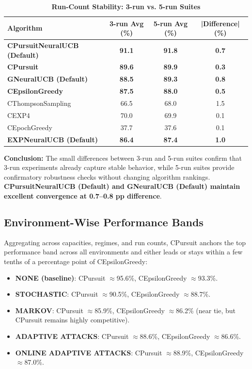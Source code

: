 \documentclass[12pt,a4paper]{article}
\newcommand{\success}[1]{\textcolor{successcolor}{\textbf{#1}}}
\newcommand{\legacy}[1]{\textcolor{legacycolor}{\textbf{#1}}}
\newcommand{\neural}[1]{\textcolor{neuralcolor}{\textbf{#1}}}
\begin{document}
\begin{table}[H]
\centering
\caption{\success{Run-Count Stability: 3-run vs. 5-run Suites}}
\begin{tabular}{|l|c|c|c|}
\hline
\textbf{Algorithm} & \textbf{3-run Avg (\%)} & \textbf{5-run Avg (\%)} & \textbf{|Difference| (\%)} \\
\hline
\hline
\neural{CPursuitNeuralUCB (Default)}  & \neural{91.1}     & \neural{91.8}     & \neural{0.7} \\
\success{CPursuit}                    & \success{89.6}     & \success{89.9}     & \success{0.3} \\
\neural{GNeuralUCB (Default)}         & \neural{88.5}     & \neural{89.3}     & \neural{0.8} \\
\success{CEpsilonGreedy}              & \success{87.5}     & \success{88.0}     & \success{0.5} \\
CThompsonSampling                     & 66.5              & 68.0              & 1.5 \\
CEXP4                                 & 70.0              & 69.9              & 0.1 \\
CEpochGreedy                          & 37.7              & 37.6              & 0.1 \\
\legacy{EXPNeuralUCB (Default)}       & \legacy{86.4}     & \legacy{87.4}     & \legacy{1.0} \\
\hline
\end{tabular}
\end{table}

\textbf{Conclusion:} The small differences between 3-run and 5-run suites confirm that 3-run experiments already capture stable behavior, while 5-run suites provide confirmatory robustness checks without changing algorithm rankings. \neural{CPursuitNeuralUCB (Default) and GNeuralUCB (Default) maintain excellent convergence at 0.7--0.8 pp difference}.

\subsection{Environment-Wise Performance Bands}

Aggregating across capacities, regimes, and run counts, CPursuit anchors the top performance band across all environments and either leads or stays within a few tenths of a percentage point of CEpsilonGreedy:

\begin{itemize}
\item \textbf{NONE (baseline)}: CPursuit $\approx$95.6\%, CEpsilonGreedy $\approx$93.3\%.
\item \textbf{STOCHASTIC}: CPursuit $\approx$90.5\%, CEpsilonGreedy $\approx$88.7\%.
\item \textbf{MARKOV}: CPursuit $\approx$85.9\%, CEpsilonGreedy $\approx$86.2\% (near tie, but CPursuit remains highly competitive).
\item \textbf{ADAPTIVE ATTACKS}: CPursuit $\approx$88.6\%, CEpsilonGreedy $\approx$86.6\%.
\item \textbf{ONLINE ADAPTIVE ATTACKS}: CPursuit $\approx$88.9\%, CEpsilonGreedy $\approx$87.0\%.
\end{itemize}
\end{document}
